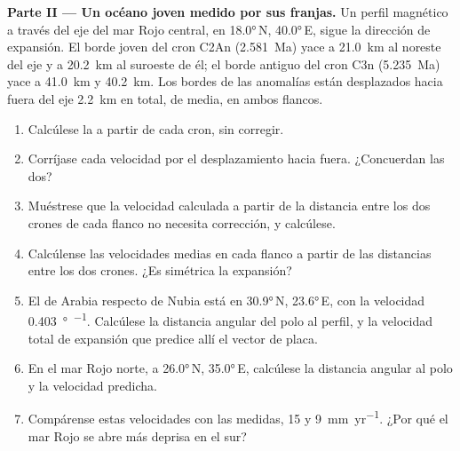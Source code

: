 \begin{problem}
\medskip
\noindent\textbf{Parte II --- Un océano joven medido por sus franjas.} Un perfil magnético a través del eje del mar Rojo central, en
\ang{18.0}\,N, \ang{40.0}\,E, sigue la dirección de expansión. El borde joven del cron C2An (\qty{2.581}{Ma}) yace a \qty{21.0}{km} al
noreste del eje y a \qty{20.2}{km} al suroeste de él; el borde antiguo del cron C3n (\qty{5.235}{Ma}) yace a \qty{41.0}{km} y
\qty{40.2}{km}. Los bordes de las anomalías están desplazados hacia fuera del eje \qty{2.2}{km} en total, de media, en ambos flancos.
\begin{enumerate}[resume]
  \item Calcúlese la  a partir de cada cron, sin corregir.
  \item Corríjase cada velocidad por el desplazamiento hacia fuera. ¿Concuerdan las dos?
  \item Muéstrese que la velocidad calculada a partir de la distancia entre los dos crones de cada flanco no necesita corrección, y calcúlese.
  \item Calcúlense las velocidades medias en cada flanco a partir de las distancias entre los dos crones. ¿Es simétrica la expansión?
  \item El  de Arabia respecto de Nubia está en \ang{30.9}\,N, \ang{23.6}\,E, con la velocidad \qty{0.403}{\degree\per\Myr}.
        Calcúlese la distancia angular del polo al perfil, y la velocidad total de expansión que predice allí el vector de placa.
  \item En el mar Rojo norte, a \ang{26.0}\,N, \ang{35.0}\,E, calcúlese la distancia angular al polo y la velocidad predicha.
  \item Compárense estas velocidades con las medidas, 15 y \qty{9}{mm.yr^{-1}}. ¿Por qué el mar Rojo se abre más deprisa en el sur?
\end{enumerate}


\end{problem}
